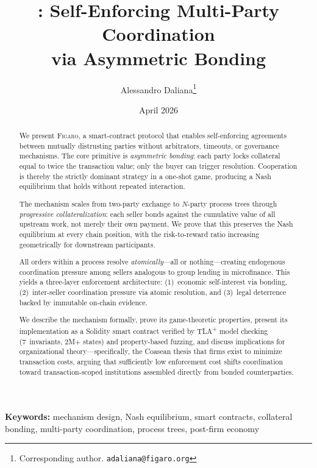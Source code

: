 \documentclass[11pt,a4paper]{article}
\title{%
  \figaro: Self-Enforcing Multi-Party Coordination\\
  via Asymmetric Bonding%
}
\author{
  Alessandro Daliana\thanks{Corresponding author. \texttt{adaliana@figaro.org}}
}
\date{April 2026}
\theoremstyle{definition}
\theoremstyle{remark}
\newcommand{\figaro}{\textsc{Figaro}}
\begin{document}
\maketitle

\begin{abstract}
We present \figaro, a smart-contract protocol that enables self-enforcing
agreements between mutually distrusting parties without arbitrators,
timeouts, or governance mechanisms. The core primitive is
\emph{asymmetric bonding}: each party locks collateral equal to twice the
transaction value; only the buyer can trigger resolution. Cooperation is
thereby the strictly dominant strategy in a one-shot game, producing a
Nash equilibrium that holds without repeated interaction.

The mechanism scales from two-party exchange to $N$-party process trees
through \emph{progressive collateralization}: each seller bonds against
the cumulative value of all upstream work, not merely their own payment.
We prove that this preserves the Nash equilibrium at every chain
position, with the risk-to-reward ratio increasing geometrically for
downstream participants.

All orders within a process resolve \emph{atomically}---all or
nothing---creating endogenous coordination pressure among sellers
analogous to group lending in microfinance. This yields a three-layer
enforcement architecture: (1)~economic self-interest via bonding,
(2)~inter-seller coordination pressure via atomic resolution, and
(3)~legal deterrence backed by immutable on-chain evidence.

We describe the mechanism formally, prove its game-theoretic properties,
present its implementation as a Solidity smart contract verified
by TLA\textsuperscript{+} model checking (7~invariants, 2M+ states) and property-based fuzzing, and
discuss implications for organizational theory---specifically, the
Coasean thesis that firms exist to minimize transaction costs, arguing
that sufficiently low enforcement cost shifts coordination toward
transaction-scoped institutions assembled directly from bonded
counterparties.

\end{abstract}

\medskip
\noindent\textbf{Keywords:}
mechanism design, Nash equilibrium, smart contracts, collateral bonding,
multi-party coordination, process trees, post-firm economy

\end{document}
